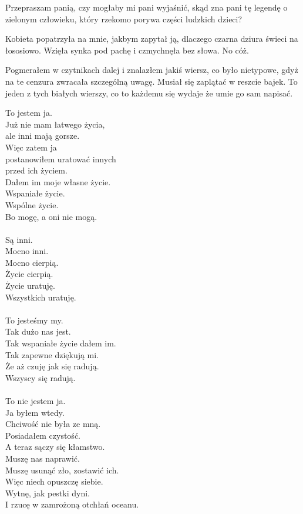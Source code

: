 \begin{dialogue}
	\ds{} Przepraszam panią, czy mogłaby mi pani wyjaśnić, skąd zna pani tę legendę o zielonym człowieku, który rzekomo porywa części ludzkich dzieci?
\end{dialogue}

Kobieta popatrzyła na mnie, jakbym zapytał ją, dlaczego czarna dziura świeci na łososiowo.
Wzięła synka pod pachę i czmychnęła bez słowa.
No cóż.

Pogmerałem w czytnikach dalej i znalazłem jakiś wiersz, co było nietypowe, gdyż na te cenzura zwracała szczególną uwagę. 
Musiał się zaplątać w reszcie bajek. To jeden z tych białych wierszy, co to każdemu się wydaje że umie go sam napisać.

\begin{poem}
	To jestem ja. \\
	Już nie mam łatwego życia, \\
	ale inni mają gorsze. \\
	Więc zatem ja \\
	postanowiłem uratować innych \\
	przed ich życiem. \\
	Dałem im moje własne życie. \\
	Wspaniałe życie. \\
	Wspólne życie. \\
	Bo mogę, a oni nie mogą. \\
	\\
	Są inni. \\
	Mocno inni. \\
	Mocno cierpią. \\
	Życie cierpią. \\
	Życie uratuję. \\
	Wszystkich uratuję. \\
	\\
	To jesteśmy my. \\
	Tak dużo nas jest. \\
	Tak wspaniałe życie dałem im. \\
	Tak zapewne dziękują mi. \\
	Że aż czuję jak się radują. \\
	Wszyscy się radują. \\
	\\
	To nie jestem ja. \\
	Ja byłem wtedy. \\
	Chciwość nie była ze mną. \\
	Posiadałem czystość. \\
	A teraz sączy się kłamstwo. \\
	Muszę nas naprawić. \\
	Muszę usunąć zło, zostawić ich. \\
	Więc niech opuszczę siebie. \\
	Wytnę, jak pestki dyni. \\
	I rzucę w zamrożoną otchłań oceanu.
\end{poem}

